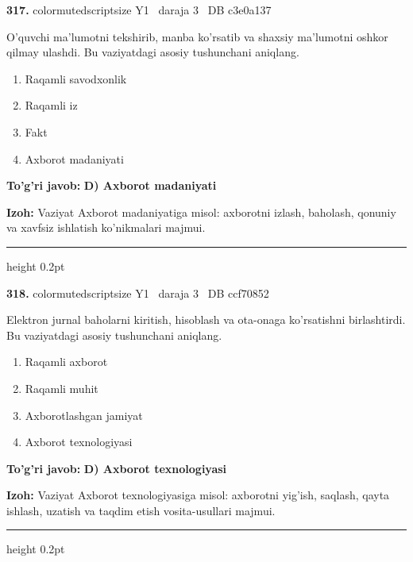 \documentclass[10pt,a4paper,oneside]{article}
\begin{document}
\noindent\textbf{\color{ink}317.}  {color{muted}scriptsize Y1 \textbullet\ daraja 3 \textbullet\ DB c3e0a137}
\par
O'quvchi ma'lumotni tekshirib, manba ko'rsatib va shaxsiy ma'lumotni oshkor qilmay ulashdi. Bu vaziyatdagi asosiy tushunchani aniqlang.
\begin{enumerate}[label=\Alph*),leftmargin=9mm]
\item Raqamli savodxonlik
\item Raqamli iz
\item Fakt
\item Axborot madaniyati
\end{enumerate}
\begin{tcolorbox}[enhanced,breakable,colback=teal!4,colframe=teal!50!black,boxrule=0.5pt,arc=1.1mm,left=3mm,right=3mm,top=1.7mm,bottom=1.7mm,before skip=2mm,after skip=2mm]
\textbf{\color{teal}To'g'ri javob:} \textbf{D) Axborot madaniyati}
\par\smallskip
\textbf{Izoh:} Vaziyat Axborot madaniyatiga misol: axborotni izlash, baholash, qonuniy va xavfsiz ishlatish ko'nikmalari majmui.
\end{tcolorbox}
\vspace{2mm}\hrule height 0.2pt \vspace{3mm}

\noindent\textbf{\color{ink}318.}  {color{muted}scriptsize Y1 \textbullet\ daraja 3 \textbullet\ DB ccf70852}
\par
Elektron jurnal baholarni kiritish, hisoblash va ota-onaga ko'rsatishni birlashtirdi. Bu vaziyatdagi asosiy tushunchani aniqlang.
\begin{enumerate}[label=\Alph*),leftmargin=9mm]
\item Raqamli axborot
\item Raqamli muhit
\item Axborotlashgan jamiyat
\item Axborot texnologiyasi
\end{enumerate}
\begin{tcolorbox}[enhanced,breakable,colback=teal!4,colframe=teal!50!black,boxrule=0.5pt,arc=1.1mm,left=3mm,right=3mm,top=1.7mm,bottom=1.7mm,before skip=2mm,after skip=2mm]
\textbf{\color{teal}To'g'ri javob:} \textbf{D) Axborot texnologiyasi}
\par\smallskip
\textbf{Izoh:} Vaziyat Axborot texnologiyasiga misol: axborotni yig'ish, saqlash, qayta ishlash, uzatish va taqdim etish vosita-usullari majmui.
\end{tcolorbox}
\vspace{2mm}\hrule height 0.2pt \vspace{3mm}
\end{document}
